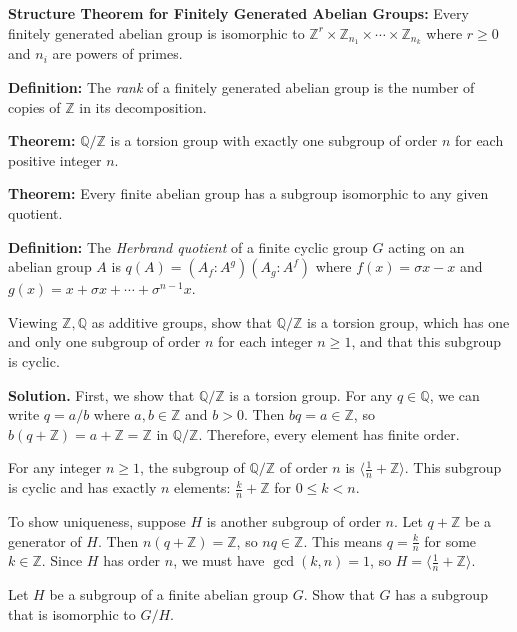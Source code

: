 \textbf{Structure Theorem for Finitely Generated Abelian Groups:} Every finitely generated abelian group is isomorphic to $\mathbb{Z}^r \times \mathbb{Z}_{n_1} \times \cdots \times \mathbb{Z}_{n_k}$ where $r \geq 0$ and $n_i$ are powers of primes.

\textbf{Definition:} The \textit{rank} of a finitely generated abelian group is the number of copies of $\mathbb{Z}$ in its decomposition.

\textbf{Theorem:} $\mathbb{Q}/\mathbb{Z}$ is a torsion group with exactly one subgroup of order $n$ for each positive integer $n$.

\textbf{Theorem:} Every finite abelian group has a subgroup isomorphic to any given quotient.

\textbf{Definition:} The \textit{Herbrand quotient} of a finite cyclic group $G$ acting on an abelian group $A$ is $q(A) = (A_f : A^g)(A_g : A^f)$ where $f(x) = \sigma x - x$ and $g(x) = x + \sigma x + \cdots + \sigma^{n-1}x$.

\begin{problembox}
Viewing $\mathbb{Z}, \mathbb{Q}$ as additive groups, show that $\mathbb{Q}/\mathbb{Z}$ is a torsion group, which has one and only one subgroup of order $n$ for each integer $n \geq 1$, and that this subgroup is cyclic.
\end{problembox}

\noindent\textbf{Solution.} First, we show that $\mathbb{Q}/\mathbb{Z}$ is a torsion group. For any $q \in \mathbb{Q}$, we can write $q = a/b$ where $a, b \in \mathbb{Z}$ and $b > 0$. Then $bq = a \in \mathbb{Z}$, so $b(q + \mathbb{Z}) = a + \mathbb{Z} = \mathbb{Z}$ in $\mathbb{Q}/\mathbb{Z}$. Therefore, every element has finite order.

For any integer $n \geq 1$, the subgroup of $\mathbb{Q}/\mathbb{Z}$ of order $n$ is $\langle \frac{1}{n} + \mathbb{Z} \rangle$. This subgroup is cyclic and has exactly $n$ elements: $\frac{k}{n} + \mathbb{Z}$ for $0 \leq k < n$.

To show uniqueness, suppose $H$ is another subgroup of order $n$. Let $q + \mathbb{Z}$ be a generator of $H$. Then $n(q + \mathbb{Z}) = \mathbb{Z}$, so $nq \in \mathbb{Z}$. This means $q = \frac{k}{n}$ for some $k \in \mathbb{Z}$. Since $H$ has order $n$, we must have $\gcd(k, n) = 1$, so $H = \langle \frac{1}{n} + \mathbb{Z} \rangle$.

\begin{problembox}
Let $H$ be a subgroup of a finite abelian group $G$. Show that $G$ has a subgroup that is isomorphic to $G/H$.
\end{problembox}


